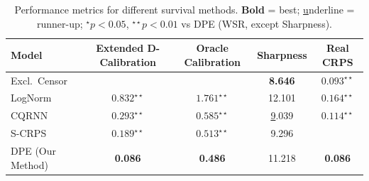 \begin{table}[htbp]
\centering
\caption{Performance metrics for different survival methods. \textbf{Bold} = best; {\ul underline} = runner-up; $^{\star}p<0.05$, $^{\star\star}p<0.01$ vs DPE (WSR, except Sharpness).}
\begin{tabular}{lcccc}
\toprule
{Model} & {{Extended D-Calibration}} & {{Oracle Calibration}} & {{Sharpness}} & {{Real CRPS}} \\
\midrule
Excl.\ Censor & {\ul $0.154^{\star \star}$} & {\ul $0.492^{\star \star}$} & \textbf{ 8.646} & $0.093^{\star\star}$ \\
LogNorm & $0.832^{\star\star}$ & $1.761^{\star\star}$ & 12.101 & $0.164^{\star\star}$ \\
CQRNN & $0.293^{\star\star}$ & $0.585^{\star\star}$ & {\ul 9.039} & $0.114^{\star\star}$ \\
S-CRPS & $ 0.189^{\star\star} $ & $0.513^{\star\star} $ & 9.296 & {\ul $0.092^{\star\star}$} \\
DPE (Our Method) & \textbf{0.086} & \textbf{0.486} & 11.218 & \textbf{0.086} \\
\bottomrule
\end{tabular}
\label{table:table2}
\end{table}